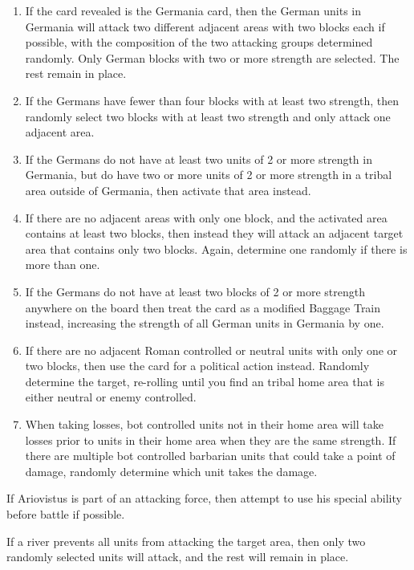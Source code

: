 \begin{enumerate}
\begin{enumerate}[leftmargin=0in]
    \item \label{solitaire:germania}If the card revealed is the Germania card, then the German units in Germania will attack two different adjacent areas with two blocks each if possible, with the composition of the two attacking groups determined randomly. Only German blocks with two or more strength are selected. The rest remain in place.

    \item If the Germans have fewer than four blocks with at least two strength, then randomly select two blocks with at least two strength and only attack one adjacent area.
    
    \item If the Germans do not have at least two units of 2 or more strength in Germania, but do have two or more units of 2 or more strength in a tribal area outside of Germania, then activate that area instead.

    \item If there are no adjacent areas with only one block, and the activated area contains at least two blocks, then instead they will attack an adjacent target area that contains only two blocks. Again, determine one randomly if there is more than one.
    
    \item If the Germans do not have at least two blocks of 2 or more strength anywhere on the board then treat the card as a modified Baggage Train instead, increasing the strength of all German units in Germania by one.

    \item If there are no adjacent Roman controlled or neutral units with only one or two blocks, then use the card for a political action instead. Randomly determine the target, re-rolling until you find an tribal home area that is either neutral or enemy controlled.
    
    \item When taking losses, bot controlled units not in their home area will take losses prior to units in their home area when they are the same strength. If there are multiple bot controlled barbarian units that could take a point of damage, randomly determine which unit takes the damage.
  \end{enumerate}
  
  If Ariovistus is part of an attacking force, then attempt to use his special ability before battle if possible.

  If a river prevents all units from attacking the target area, then only two randomly selected units will attack, and the rest will remain in place.


\end{enumerate}
